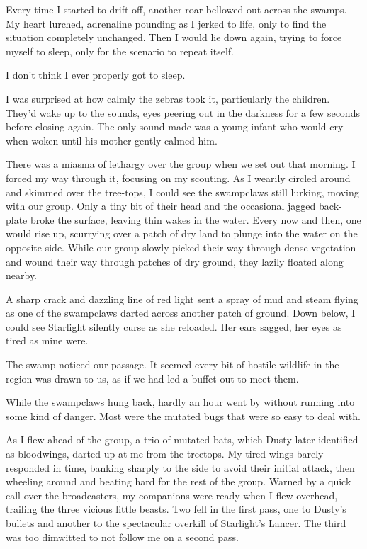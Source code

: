 Every time I started to drift off, another roar bellowed out across the swamps. My heart lurched, adrenaline pounding as I jerked to life, only to find the situation completely unchanged. Then I would lie down again, trying to force myself to sleep, only for the scenario to repeat itself.

I don’t think I ever properly got to sleep.

I was surprised at how calmly the zebras took it, particularly the children. They’d wake up to the sounds, eyes peering out in the darkness for a few seconds before closing again. The only sound made was a young infant who would cry when woken until his mother gently calmed him.

There was a miasma of lethargy over the group when we set out that morning. I forced my way through it, focusing on my scouting. As I wearily circled around and skimmed over the tree-tops, I could see the swampclaws still lurking, moving with our group. Only a tiny bit of their head and the occasional jagged back-plate broke the surface, leaving thin wakes in the water. Every now and then, one would rise up, scurrying over a patch of dry land to plunge into the water on the opposite side. While our group slowly picked their way through dense vegetation and wound their way through patches of dry ground, they lazily floated along nearby.

A sharp crack and dazzling line of red light sent a spray of mud and steam flying as one of the swampclaws darted across another patch of ground. Down below, I could see Starlight silently curse as she reloaded. Her ears sagged, her eyes as tired as mine were.

The swamp noticed our passage. It seemed every bit of hostile wildlife in the region was drawn to us, as if we had led a buffet out to meet them.

While the swampclaws hung back, hardly an hour went by without running into some kind of danger. Most were the mutated bugs that were so easy to deal with.

As I flew ahead of the group, a trio of mutated bats, which Dusty later identified as bloodwings, darted up at me from the treetops. My tired wings barely responded in time, banking sharply to the side to avoid their initial attack, then wheeling around and beating hard for the rest of the group. Warned by a quick call over the broadcasters, my companions were ready when I flew overhead, trailing the three vicious little beasts. Two fell in the first pass, one to Dusty’s bullets and another to the spectacular overkill of Starlight’s Lancer. The third was too dimwitted to not follow me on a second pass.

